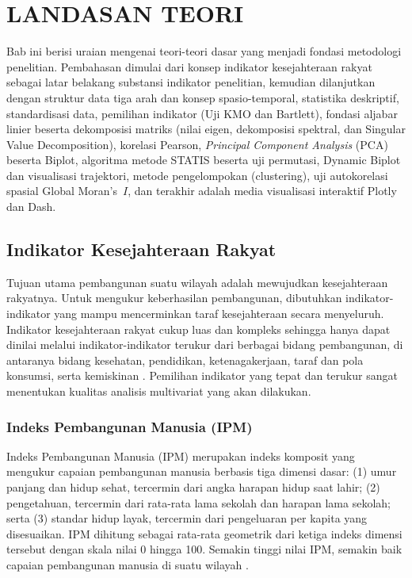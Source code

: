 \chapter{\normalsize LANDASAN TEORI}
\raggedbottom

Bab ini berisi uraian mengenai teori-teori dasar yang menjadi fondasi metodologi penelitian. Pembahasan dimulai dari konsep indikator kesejahteraan rakyat sebagai latar belakang substansi indikator penelitian, kemudian dilanjutkan dengan struktur data tiga arah dan konsep spasio-temporal, statistika deskriptif, standardisasi data, pemilihan indikator (Uji KMO dan Bartlett), fondasi aljabar linier beserta dekomposisi matriks (nilai eigen, dekomposisi spektral, dan Singular Value Decomposition), korelasi Pearson, \textit{Principal Component Analysis} (PCA) beserta Biplot, algoritma metode STATIS beserta uji permutasi, Dynamic Biplot dan visualisasi trajektori, metode pengelompokan (clustering), uji autokorelasi spasial Global Moran's~$I$, dan terakhir adalah media visualisasi interaktif Plotly dan Dash.

\section{\normalsize Indikator Kesejahteraan Rakyat}

Tujuan utama pembangunan suatu wilayah adalah mewujudkan kesejahteraan rakyatnya. Untuk mengukur keberhasilan pembangunan, dibutuhkan indikator-indikator yang mampu mencerminkan taraf kesejahteraan secara menyeluruh. Indikator kesejahteraan rakyat cukup luas dan kompleks sehingga hanya dapat dinilai melalui indikator-indikator terukur dari berbagai bidang pembangunan, di antaranya bidang kesehatan, pendidikan, ketenagakerjaan, taraf dan pola konsumsi, serta kemiskinan \citep{bpsikr2025}. Pemilihan indikator yang tepat dan terukur sangat menentukan kualitas analisis multivariat yang akan dilakukan.

\subsection{\normalsize Indeks Pembangunan Manusia (IPM)}
Indeks Pembangunan Manusia (IPM) merupakan indeks komposit yang mengukur capaian pembangunan manusia berbasis tiga dimensi dasar: (1) umur panjang dan hidup sehat, tercermin dari angka harapan hidup saat lahir; (2) pengetahuan, tercermin dari rata-rata lama sekolah dan harapan lama sekolah; serta (3) standar hidup layak, tercermin dari pengeluaran per kapita yang disesuaikan. IPM dihitung sebagai rata-rata geometrik dari ketiga indeks dimensi tersebut dengan skala nilai 0 hingga 100. Semakin tinggi nilai IPM, semakin baik capaian pembangunan manusia di suatu wilayah \citep{bpsikr2025}.

